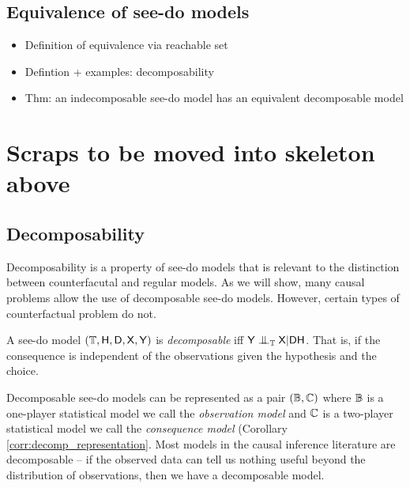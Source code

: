 \subsection{Equivalence of see-do models}

\begin{itemize}
    \item Definition of equivalence via reachable set
    \item Defintion + examples: decomposability
    \item Thm: an indecomposable see-do model has an equivalent decomposable model
\end{itemize}

\section{Scraps to be moved into skeleton above}

\subsection{Decomposability}

Decomposability is a property of see-do models that is relevant to the distinction between counterfacutal and regular models. As we will show, many causal problems allow the use of decomposable see-do models. However, certain types of counterfactual problem do not.

\begin{definition}[decomposability]\label{def:decomposability}
A see-do model $(\mathbb{T},\mathsf{H},\mathsf{D},\mathsf{X},\mathsf{Y})$ is \emph{decomposable} iff $\RV{Y}\CI_\kernel{T} \RV{X}|\RV{D}\RV{H}$. That is, if the consequence is independent of the observations given the hypothesis and the choice.
\end{definition}

Decomposable see-do models can be represented as a pair $(\mathbb{B},\mathbb{C})$ where $\mathbb{B}$ is a one-player statistical model we call the \emph{observation model} and $\mathbb{C}$ is a two-player statistical model we call the \emph{consequence model} (Corollary \ref{corr:decomp_representation}. Most models in the causal inference literature are decomposable -- if the observed data can tell us nothing useful beyond the distribution of observations, then we have a decomposable model.

